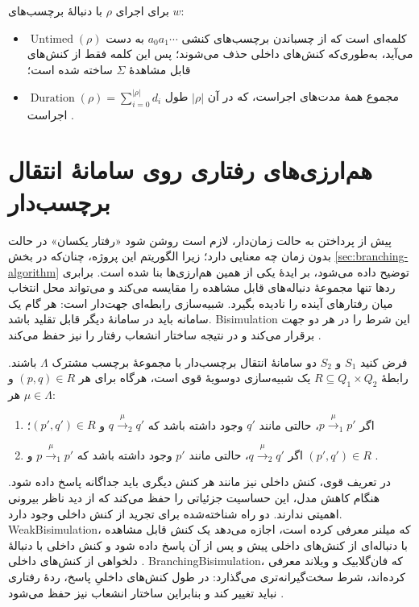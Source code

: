 \begin{definition}
\label{def:untimed-duration}
برای اجرای $\rho$ با دنبالهٔ برچسب‌های $w$:
\begin{itemize}
\item $\operatorname{Untimed}(\rho)$ کلمه‌ای است که از چسباندن برچسب‌های کنشی $a_0a_1\cdots$ به دست می‌آید، به‌طوری‌که کنش‌های داخلی حذف می‌شوند؛ پس این کلمه فقط از کنش‌های قابل مشاهدهٔ $\Sigma$ ساخته شده است؛
\item $\operatorname{Duration}(\rho)=\sum_{i=0}^{|\rho|}d_i$ مجموع همهٔ مدت‌های اجراست، که در آن $|\rho|$ طول اجراست \cite{BerardEtAl2008}.
\end{itemize}
\end{definition}

\section{هم‌ارزی‌های رفتاری روی سامانهٔ انتقال برچسب‌دار}
\label{sec:behavioural-equivalences}

پیش از پرداختن به حالت زمان‌دار، لازم است روشن شود «رفتار یکسان» در حالت بدون زمان چه معنایی دارد؛ زیرا الگوریتم این پروژه، چنان‌که در بخش \ref{sec:branching-algorithm} توضیح داده می‌شود، بر ایدهٔ یکی از همین هم‌ارزی‌ها بنا شده است. برابری ردها تنها مجموعهٔ دنباله‌های قابل مشاهده را مقایسه می‌کند و می‌تواند محل انتخاب میان رفتارهای آینده را نادیده بگیرد. شبیه‌سازی رابطه‌ای جهت‌دار است: هر گام یک سامانه باید در سامانهٔ دیگر قابل تقلید باشد. \gls{Bisimulation} این شرط را در هر دو جهت برقرار می‌کند و در نتیجه ساختار انشعاب رفتار را نیز حفظ می‌کند \cite{BaierKatoen2008,Milner1989}.

\begin{definition}
\label{def:strong-bisimulation}
فرض کنید $S_1$ و $S_2$ دو سامانهٔ انتقال برچسب‌دار با مجموعهٔ برچسب مشترک $\Lambda$ باشند. رابطهٔ $R\subseteq Q_1\times Q_2$ یک شبیه‌سازی دوسویهٔ قوی است، هرگاه برای هر $(p,q)\in R$ و هر $\mu\in\Lambda$:
\begin{enumerate}
\item اگر $p\xrightarrow{\mu}_1p'$، حالتی مانند $q'$ وجود داشته باشد که $q\xrightarrow{\mu}_2q'$ و $(p',q')\in R$؛
\item اگر $q\xrightarrow{\mu}_2q'$، حالتی مانند $p'$ وجود داشته باشد که $p\xrightarrow{\mu}_1p'$ و $(p',q')\in R$ \cite{Milner1989,BaierKatoen2008}.
\end{enumerate}
\end{definition}

در تعریف قوی، کنش داخلی نیز مانند هر کنش دیگری باید جداگانه پاسخ داده شود. هنگام کاهش مدل، این حساسیت جزئیاتی را حفظ می‌کند که از دید ناظر بیرونی اهمیتی ندارند. دو راه شناخته‌شده برای تجرید از کنش داخلی وجود دارد. \gls{WeakBisimulation}، که میلنر معرفی کرده است، اجازه می‌دهد یک کنش قابل مشاهده با دنباله‌ای از کنش‌های داخلی پیش و پس از آن پاسخ داده شود و کنش داخلی با دنبالهٔ دلخواهی از کنش‌های داخلی \cite{Milner1989}. \gls{BranchingBisimulation}، که فان‌گلابیک و ویلاند معرفی کرده‌اند، شرط سخت‌گیرانه‌تری می‌گذارد: در طول کنش‌های داخلیِ پاسخ، ردهٔ رفتاری نباید تغییر کند و بنابراین ساختار انشعاب نیز حفظ می‌شود \cite{GlabbeekWeijland1996}.

